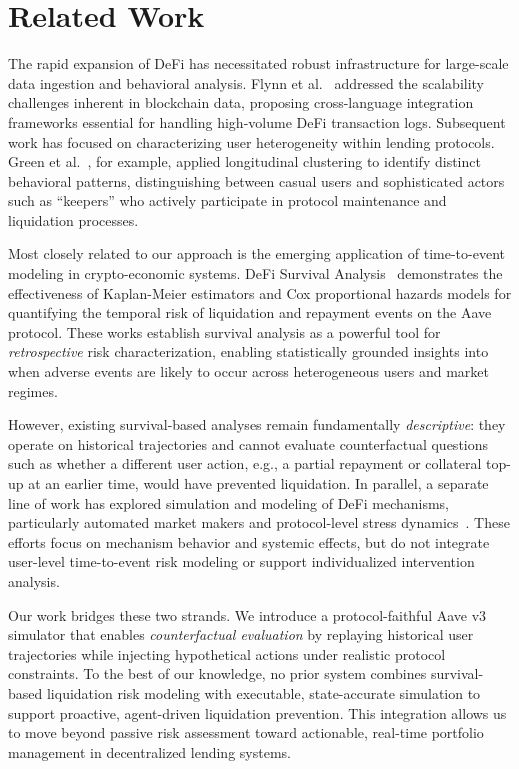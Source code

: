 \documentclass[manuscript,screen,review]{acmart}
\begin{document}
\section{Related Work}
\label{sec:related_work}

The rapid expansion of DeFi has necessitated robust infrastructure for large-scale data ingestion and behavioral analysis. Flynn et al.~\cite{flynn2023enabling} addressed the scalability challenges inherent in blockchain data, proposing cross-language integration frameworks essential for handling high-volume DeFi transaction logs. Subsequent work has focused on characterizing user heterogeneity within lending protocols. Green et al.~\cite{green2023characterizing}, for example, applied longitudinal clustering to identify distinct behavioral patterns, distinguishing between casual users and sophisticated actors such as ``keepers'' who actively participate in protocol maintenance and liquidation processes.

Most closely related to our approach is the emerging application of time-to-event modeling in crypto-economic systems. DeFi Survival Analysis~\cite{green2022defi,green2023defi,spadea2025predictability} demonstrates the effectiveness of Kaplan-Meier estimators and Cox proportional hazards models for quantifying the temporal risk of liquidation and repayment events on the Aave protocol. These works establish survival analysis as a powerful tool for \emph{retrospective} risk characterization, enabling statistically grounded insights into when adverse events are likely to occur across heterogeneous users and market regimes.

However, existing survival-based analyses remain fundamentally \emph{descriptive}: they operate on historical trajectories and cannot evaluate counterfactual questions such as whether a different user action, e.g., a partial repayment or collateral top-up at an earlier time, would have prevented liquidation. In parallel, a separate line of work has explored simulation and modeling of DeFi mechanisms, particularly automated market makers and protocol-level stress dynamics~\cite{elsts2021liquiditymath,chemaya2024uniswapv2v3,bis2023defifragility}. These efforts focus on mechanism behavior and systemic effects, but do not integrate user-level time-to-event risk modeling or support individualized intervention analysis.

Our work bridges these two strands. We introduce a protocol-faithful Aave v3 simulator that enables \emph{counterfactual evaluation} by replaying historical user trajectories while injecting hypothetical actions under realistic protocol constraints. To the best of our knowledge, no prior system combines survival-based liquidation risk modeling with executable, state-accurate simulation to support proactive, agent-driven liquidation prevention. This integration allows us to move beyond passive risk assessment toward actionable, real-time portfolio management in decentralized lending systems.
\end{document}
